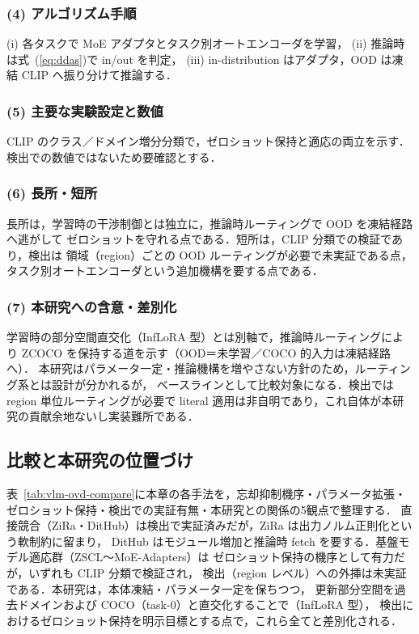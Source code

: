 \subsubsection*{(4) アルゴリズム手順}
(i) 各タスクで MoE アダプタとタスク別オートエンコーダを学習，
(ii) 推論時は式~(\ref{eq:ddas})で in/out を判定，
(iii) in-distribution はアダプタ，OOD は凍結 CLIP へ振り分けて推論する．

\subsubsection*{(5) 主要な実験設定と数値}
CLIP のクラス／ドメイン増分分類で，ゼロショット保持と適応の両立を示す．
検出での数値ではないため要確認とする．

\subsubsection*{(6) 長所・短所}
長所は，学習時の干渉制御とは独立に，推論時ルーティングで OOD を凍結経路へ逃がして
ゼロショットを守れる点である．短所は，CLIP 分類での検証であり，検出は
領域（region）ごとの OOD ルーティングが必要で未実証である点，
タスク別オートエンコーダという追加機構を要する点である．

\subsubsection*{(7) 本研究への含意・差別化}
学習時の部分空間直交化（InfLoRA 型）とは別軸で，推論時ルーティングにより
ZCOCO を保持する道を示す（OOD＝未学習／COCO 的入力は凍結経路へ）．
本研究はパラメータ一定・推論機構を増やさない方針のため，ルーティング系とは設計が分かれるが，
ベースラインとして比較対象になる．検出では region 単位ルーティングが必要で
literal 適用は非自明であり，これ自体が本研究の貢献余地ないし実装難所である．

\subsection{比較と本研究の位置づけ}
\label{sub:vlm-ovd-summary}
表~\ref{tab:vlm-ovd-compare}に本章の各手法を，忘却抑制機序・パラメータ拡張・
ゼロショット保持・検出での実証有無・本研究との関係の5観点で整理する．
直接競合（ZiRa・DitHub）は検出で実証済みだが，ZiRa は出力ノルム正則化という軟制約に留まり，
DitHub はモジュール増加と推論時 fetch を要する．基盤モデル適応群（ZSCL〜MoE-Adapters）は
ゼロショット保持の機序として有力だが，いずれも CLIP 分類で検証され，
検出（region レベル）への外挿は未実証である．本研究は，本体凍結・パラメータ一定を保ちつつ，
更新部分空間を過去ドメインおよび COCO（task-0）と直交化することで（InfLoRA 型），
検出におけるゼロショット保持を明示目標とする点で，これら全てと差別化される．

